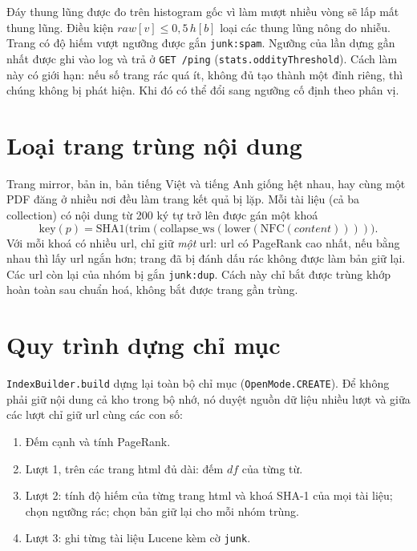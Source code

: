 \documentclass[12pt,a4paper]{report}
\begin{document}
Đáy thung lũng được đo trên histogram gốc vì làm mượt nhiều vòng sẽ lấp mất thung lũng. Điều kiện
$\mathit{raw}[v] \le 0{,}5\,h[b]$ loại các thung lũng nông do nhiễu. Trang có độ hiếm vượt ngưỡng được gắn
\texttt{junk:spam}. Ngưỡng của lần dựng gần nhất được ghi vào log và trả ở \texttt{GET /ping}
(\texttt{stats.oddityThreshold}). Cách làm này có giới hạn: nếu số trang rác quá ít, không đủ tạo thành một đỉnh riêng,
thì chúng không bị phát hiện. Khi đó có thể đổi sang ngưỡng cố định theo phân vị.

\section{Loại trang trùng nội dung}

Trang mirror, bản in, bản tiếng Việt và tiếng Anh giống hệt nhau, hay cùng một PDF đăng ở nhiều nơi đều làm trang kết
quả bị lặp. Mỗi tài liệu (cả ba collection) có nội dung từ 200 ký tự trở lên được gán một khoá
\begin{equation}
\mathrm{key}(p) = \mathrm{SHA1}\big(\mathrm{trim}(\mathrm{collapse\_\allowbreak{}ws}(\mathrm{lower}(\mathrm{NFC}(\mathit{content}))))\big).
\end{equation}
Với mỗi khoá có nhiều url, chỉ giữ \emph{một} url: url có PageRank cao nhất, nếu bằng nhau thì lấy url ngắn hơn; trang đã
bị đánh dấu rác không được làm bản giữ lại. Các url còn lại của nhóm bị gắn \texttt{junk:dup}. Cách này chỉ bắt được
trùng khớp hoàn toàn sau chuẩn hoá, không bắt được trang gần trùng.

\section{Quy trình dựng chỉ mục}

\texttt{IndexBuilder.build} dựng lại toàn bộ chỉ mục (\texttt{OpenMode.CREATE}). Để không phải giữ nội dung cả kho trong
bộ nhớ, nó duyệt nguồn dữ liệu nhiều lượt và giữa các lượt chỉ giữ url cùng các con số:

\begin{enumerate}
  \item Đếm cạnh và tính PageRank.
  \item Lượt 1, trên các trang html đủ dài: đếm $\mathit{df}$ của từng từ.
  \item Lượt 2: tính độ hiếm của từng trang html và khoá SHA-1 của mọi tài liệu; chọn ngưỡng rác; chọn bản giữ lại cho
        mỗi nhóm trùng.
  \item Lượt 3: ghi từng tài liệu Lucene kèm cờ \texttt{junk}.
\end{enumerate}
\end{document}
